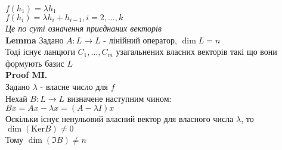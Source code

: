 \documentclass[a4paper, 10pt]{article}
\def\lm#1{\textbf{Lemma {#1}}}
\def\proofMI{\textbf{Proof MI.}\\}
\def\ker#1{\textrm{Ker} {#1}}
\theoremstyle{theoremdd}
\theoremstyle{theoremdd}
\theoremstyle{theoremdd}
\theoremstyle{theoremdd}
\theoremstyle{theoremdd}
\theoremstyle{theoremdd}
\theoremstyle{theoremdd}
\theoremstyle{theoremdd}
\begin{document}
$f(h_1) = \lambda h_1$\\
$f(h_i) = \lambda h_i + h_{i-1}, i=2,\dots,k$\\
\textit{Це по суті означення приєднаних векторів}
\bigskip \\
\lm{} Задано $A: L \to L$ - лінійний оператор, $\dim L = n$\\
Тоді існує ланцюги $C_1,\dots,C_m$ узагальнених власних векторів такі що вони формують базис $L$\\
\proofMI
Задано $\lambda$ - власне число для $f$\\
Нехай $B: L \to L$ визначене наступним чином:\\
$Bx = Ax - \lambda x = (A - \lambda I)x$\\
Оскільки існує ненульовий власний вектор для власного числа $\lambda$, то $\dim (\ker B) \neq 0$\\
Тому $\dim (\Im B) \neq n$\\
\newpage
\end{document}

